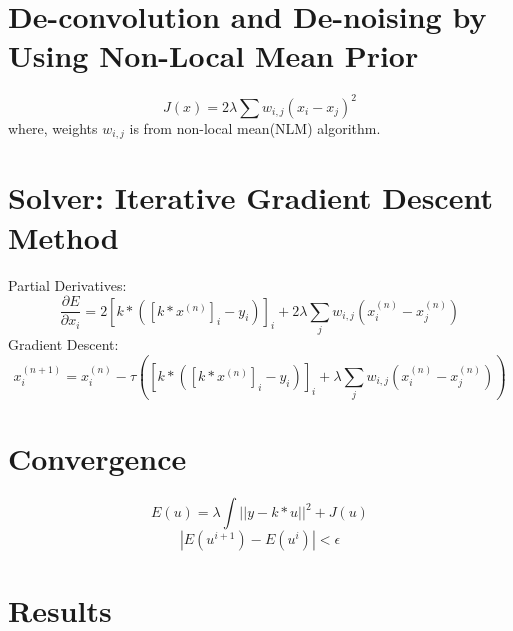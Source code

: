 \documentclass[paper=a4, fontsize=11pt]{scrartcl}
\begin{document}
\section{De-convolution and De-noising by Using Non-Local Mean Prior}
\begin{equation}
  J(x)=2\lambda \sum{w_{i,j}{(x_i-x_j)}^2}
\end{equation}
where, weights $w_{i,j}$ is from non-local mean(NLM) algorithm.

\section{Solver: Iterative Gradient Descent Method}
Partial Derivatives:
\begin{equation}
\frac{\partial E}{\partial x_i} = 2 {\left[k \ast \left({[k \ast x^{(n)}]}_i-y_i \right)\right]}_i + 2 \lambda \sum_{j}{w_{i,j}{(x_i^{(n)}-x_j^{(n)})}}
\end{equation}
Gradient Descent:
\begin{equation}
x_i^{(n+1)}= x_i^{(n)}-\tau \left( {\left[k \ast \left({[k \ast x^{(n)}]}_i-y_i \right)\right]}_i  +\lambda \sum_{j}{w_{i,j}{(x_i^{(n)}-x_j^{(n)})}} \right)
\end{equation}

\section{Convergence}
\begin{equation}
E(u) = \lambda \int ||y-k*u||^2 + J(u)
\end{equation}
\begin{equation}
|E(u^{i+1})-E(u^{i})| < \epsilon
\end{equation}

\section{Results}
\end{document}
